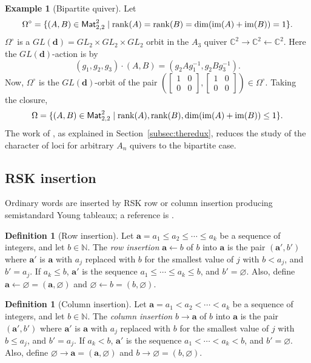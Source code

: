 \documentclass[12pt]{amsart}
\renewcommand{\d}{\mathbf{d}}
\newcommand{\bs}{\boldsymbol}
\theoremstyle{definition}
\newtheorem{definition}[theorem]{Definition}
\newtheorem{example}[theorem]{Example}
\theoremstyle{remark}
\begin{document}
\begin{example}[Bipartite quiver]
Let 
\[\Omega^{\circ}=\{(A,B)\in {\sf Mat}_{2,2}^2 \mid \operatorname{rank}(A)={\operatorname{rank}}(B)=\dim(\operatorname{im}(A)+\operatorname{im}(B))=1\}.\]
$\Omega^{\circ}$ is a ${GL}(\d)=GL_2\times GL_2\times GL_2$ orbit in the $A_3$ quiver
${\mathbb C}^2\rightarrow {\mathbb C}^2 \leftarrow
{\mathbb C}^2$. Here the ${GL}(\d)$-action is by
\[(g_1,g_2,g_3)\cdot(A,B)=(g_2 A g_1^{-1}, g_2 B g_{3}^{-1}).\]
Now, $\Omega^{\circ}$ is the $GL(\d)$-orbit of the pair $\left(\left[\begin{smallmatrix} 1 & 0 \\ 0 & 0 \end{smallmatrix}\right],
\left[\begin{smallmatrix} 1 & 0 \\ 0 & 0 \end{smallmatrix}\right]\right)\in \Omega^{\circ}$. Taking the closure, 
\[\Omega=\{(A,B)\in {\sf Mat}_{2,2}^2 \mid \operatorname{rank}(A), {\operatorname{rank}}(B), \dim(\operatorname{im}(A)+\operatorname{im}(B))\leq 1\}.\]
The work of \cite{KinserRajchgot,KKR}, as explained in Section~\ref{subsec:theredux}, reduces the study of the 
character of loci for arbitrary $A_n$ quivers
to the bipartite case. 
\end{example}

\subsection{RSK insertion} \label{sec:RSKinsertion}
Ordinary words are inserted by RSK row or column insertion producing semistandard Young tableaux; a reference is \cite{Fulton-book}. 

\begin{definition}[Row insertion] Let 
$\bs{a} = a_1\le a_2\le\cdots\le a_k$ 
be a sequence of integers, and let $b\in {\mathbb N}$. The \emph{row insertion} 
$\bs{a}\leftarrow b$
of $b$ into $\bs{a}$ is the pair $(\bs{a}',b')$ where $\bs{a'}$ is $\bs{a}$ with $a_j$ replaced with $b$ for the smallest value of $j$ with $b<a_j$, and $b'=a_j$. If $a_k\le b$, $\bs{a}'$ is the sequence $a_1\le \cdots \le a_k\le b$, and $b' = \varnothing$. Also, define $\bs{a}\leftarrow\varnothing = (\bs{a},\varnothing)$ and $\varnothing\leftarrow b = (b,\varnothing)$.
\end{definition}

\begin{definition}[Column insertion] Let 
$\bs{a} = a_1< a_2<\cdots< a_k$ 
be a sequence of integers, and let $b\in {\mathbb N}$. The \emph{column insertion} 
$b\rightarrow \bs{a}$
of $b$ into $\bs{a}$ is the pair $(\bs{a}',b')$ where $\bs{a'}$ is $\bs{a}$ with $a_j$ replaced with $b$ for the smallest value of $j$ with $b\leq a_j$, and $b'=a_j$. If $a_k< b$, $\bs{a}'$ is the sequence $a_1< \cdots < a_k< b$, and $b' = \varnothing$. Also, define $\varnothing \rightarrow \bs{a}= (\bs{a},\varnothing)$ and $b\rightarrow \varnothing = (b,\varnothing)$.
\end{definition}
\end{document}

